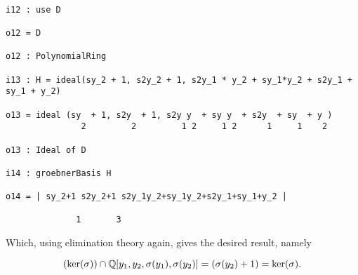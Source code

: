 \begin{lstlisting}

i12 : use D

o12 = D

o12 : PolynomialRing

i13 : H = ideal(sy_2 + 1, s2y_2 + 1, s2y_1 * y_2 + sy_1*y_2 + s2y_1 + sy_1 + y_2)

o13 = ideal (sy  + 1, s2y  + 1, s2y y  + sy y  + s2y  + sy  + y )
               2         2         1 2     1 2      1     1    2

o13 : Ideal of D

i14 : groebnerBasis H

o14 = | sy_2+1 s2y_2+1 s2y_1y_2+sy_1y_2+s2y_1+sy_1+y_2 |

              1       3

\end{lstlisting}
 
Which, using elimination theory again, gives the desired result, namely

$$ (\ker(\sigma)) \cap \mathbb{Q}[y_1,y_2,\sigma(y_1),\sigma(y_2)] = (\sigma(y_2) +1) = \ker(\sigma) .$$

